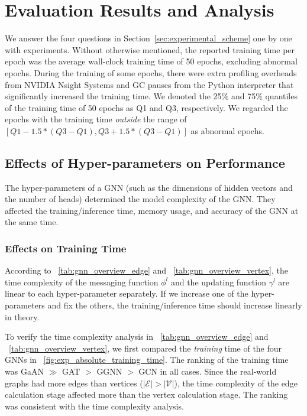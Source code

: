 \section{Evaluation Results and Analysis}
\label{sec:experiment_results}

We answer the four questions in Section~\ref{sec:experimental_scheme} one by one with experiments.
%
Without otherwise mentioned, the reported training time per epoch was the average wall-clock training time of 50 epochs, excluding abnormal epochs.
%
During the training of some epochs, there were extra profiling overheads from NVIDIA Nsight Systems and GC pauses from the Python interpreter that significantly increased the training time.
%
We denoted the 25\% and 75\% quantiles of the training time of 50 epochs as Q1 and Q3, respectively.
%
We regarded the epochs with the training time \emph{outside} the range of $[Q1 - 1.5 * (Q3-Q1), Q3 + 1.5 * (Q3-Q1)]$ as abnormal epochs.

\subsection{Effects of Hyper-parameters on Performance}
\label{sec:effects_of_hyper-parameters_on_performance}

The hyper-parameters of a GNN (such as the dimensions of hidden vectors and the number of heads) determined the model complexity of the GNN.
%
They affected the training/inference time, memory usage, and accuracy of the GNN at the same time.


\subsubsection{Effects on Training Time}

According to \tablename~\ref{tab:gnn_overview_edge} and \tablename~\ref{tab:gnn_overview_vertex}, the time complexity of the messaging function $\phi^l$ and the updating function $\gamma^l$ are linear to each hyper-parameter separately.
%
If we increase one of the hyper-parameters and fix the others, the training/inference time should increase linearly in theory.

To verify the time complexity analysis in \tablename~\ref{tab:gnn_overview_edge} and \tablename~\ref{tab:gnn_overview_vertex}, we first compared the \emph{training} time of the four GNNs in \figurename~\ref{fig:exp_absolute_training_time}.
%
The ranking of the training time was GaAN $\gg$ GAT $>$ GGNN $>$ GCN in all cases.
%
Since the real-world graphs had more edges than vertices ($|\mathcal{E}| > |\mathcal{V}|$), the time complexity of the edge calculation stage affected more than the vertex calculation stage.
%
The ranking was consistent with the time complexity analysis.

